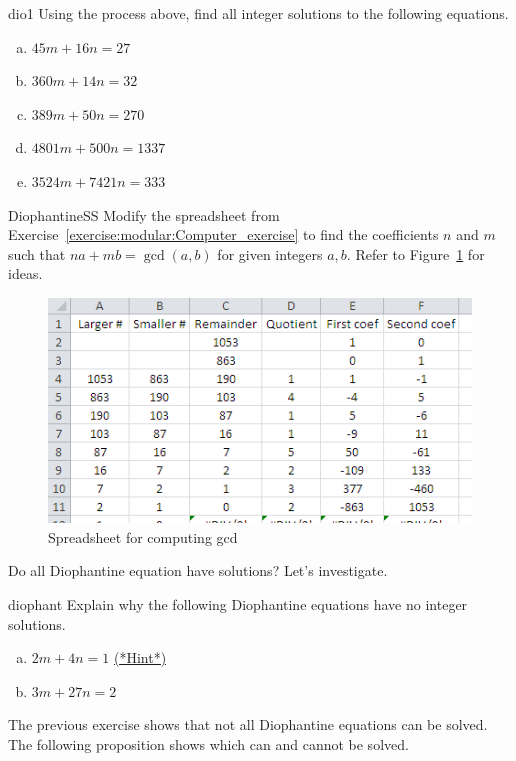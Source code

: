 \begin{exercise}{dio1}
Using the process above, find all integer solutions to the following equations.
\begin{enumerate} [(a)]
\item
$45m + 16n = 27$
\item
$360m + 14n = 32$
\item
$389m + 50n = 270$
\item
$4801m + 500n = 1337$
\item
$ 3524m + 7421n = 333$
\end {enumerate}
\end {exercise}

\begin{exercise}{DiophantineSS}
Modify the spreadsheet from Exercise~\ref{exercise:modular:Computer_exercise} to find the coefficients $n$ and $m$ such that $na + mb = \gcd(a,b)$ for given integers $a,b$.  Refer to Figure~\ref{fig:gcd_spreadsheet_with_coefs} for ideas.
\end{exercise}

\begin{figure}[h]
\begin{center}
\includegraphics[width=4.5in]{images/gcd_spreadsheet_with_coefs.png}
\end{center}
\caption{Spreadsheet for computing gcd}\label{fig:gcd_spreadsheet_with_coefs}
\end{figure}


Do all  Diophantine equation have solutions? Let's investigate.

\begin{exercise}{diophant}
Explain why the following Diophantine equations have no integer solutions.
\begin{enumerate} [(a)]
\item
$2m + 4n = 1$
\hyperref[sec:modular_arithmetic:hints]{(*Hint*)}
\item
$3m + 27n = 2$
\end {enumerate}
\end {exercise}
The previous exercise shows that not all Diophantine equations can be solved.  The following proposition shows which can and cannot be solved.

